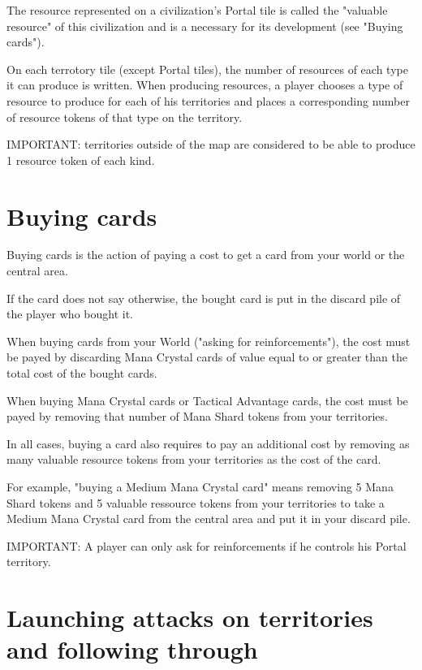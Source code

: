 \documentclass[a4paper]{article}
\begin{document}
    The resource represented on a civilization's Portal tile is called the "valuable resource" of this civilization and is a necessary for its development (see "Buying cards").

    On each terrotory tile (except Portal tiles), the number of resources of each type it can produce is written.
    When producing resources, a player chooses a type of resource to produce for each of his territories and places a corresponding number of resource tokens of that type on the territory.

    IMPORTANT: territories outside of the map are considered to be able to produce 1 resource token of each kind.



\section{Buying cards}

    Buying cards is the action of paying a cost to get a card from your world or the central area.

    If the card does not say otherwise, the bought card is put in the discard pile of the player who bought it.

    When buying cards from your World ("asking for reinforcements"),
    the cost must be payed by discarding Mana Crystal cards of value equal to or greater
    than the total cost of the bought cards.

    When buying Mana Crystal cards or Tactical Advantage cards,
    the cost must be payed by removing that number of Mana Shard tokens from your territories.

    In all cases, buying a card also requires to pay an additional cost by removing as
    many valuable resource tokens from your territories as the cost of the card.

    For example, "buying a Medium Mana Crystal card" means removing 5 Mana Shard tokens and 5 valuable ressource
    tokens from your territories to take a Medium Mana Crystal card from the central area and put it in your discard pile.

    IMPORTANT: A player can only ask for reinforcements if he controls his Portal territory. 


\newpage
\section{Launching attacks on territories and following through}
\end{document}

